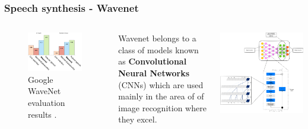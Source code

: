 \documentclass[a4paper,9pt]{beamer}
\theoremstyle{mytheoremstyle}
\begin{document}
\begin{frame}
\frametitle{Speech synthesis - Wavenet}
\begin{columns}
\begin{figure}
\begin{center}
  \includegraphics[width=\textwidth]{res/wavenet_evaluation.png}
\end{center}
	\caption{Google WaveNet evaluation results \parencite{vandenoord2016a}.}
\end{figure}
\begin{exampleblock}{}
\scriptsize{
Wavenet belongs to a class of models known as
\textbf{Convolutional Neural Networks} (CNNs)
which are used mainly in the area of of image recognition where they excel.}
\end{exampleblock}
\includegraphics[width=\textwidth]{res/tcn.png}
\end{columns}
\end{frame}
\end{document}
